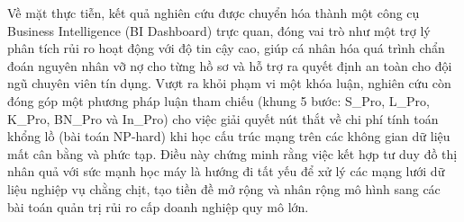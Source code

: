 Về mặt thực tiễn, kết quả nghiên cứu được chuyển hóa thành một công cụ Business Intelligence (BI Dashboard) trực quan, đóng vai trò như một trợ lý phân tích rủi ro hoạt động với độ tin cậy cao, giúp cá nhân hóa quá trình chẩn đoán nguyên nhân vỡ nợ cho từng hồ sơ và hỗ trợ ra quyết định an toàn cho đội ngũ chuyên viên tín dụng. Vượt ra khỏi phạm vi một khóa luận, nghiên cứu còn đóng góp một phương pháp luận tham chiếu (khung 5 bước: S\_Pro, L\_Pro, K\_Pro, BN\_Pro và In\_Pro) cho việc giải quyết nút thắt về chi phí tính toán khổng lồ (bài toán NP-hard) khi học cấu trúc mạng trên các không gian dữ liệu mất cân bằng và phức tạp. Điều này chứng minh rằng việc kết hợp tư duy đồ thị nhân quả với sức mạnh học máy là hướng đi tất yếu để xử lý các mạng lưới dữ liệu nghiệp vụ chằng chịt, tạo tiền đề mở rộng và nhân rộng mô hình sang các bài toán quản trị rủi ro cấp doanh nghiệp quy mô lớn. 